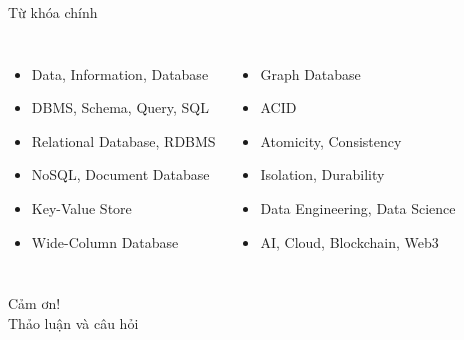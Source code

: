 ﻿\documentclass[aspectratio=169,11pt]{beamer}
\newcommand{\tightlist}{\setlength{\itemsep}{2pt}\setlength{\parskip}{0pt}}
\begin{document}
\begin{frame}{Từ khóa chính}
\small
\begin{columns}[T]
\begin{itemize}
\tightlist
  \item Data, Information, Database
  \item DBMS, Schema, Query, SQL
  \item Relational Database, RDBMS
  \item NoSQL, Document Database
  \item Key-Value Store
  \item Wide-Column Database
\end{itemize}
\begin{itemize}
\tightlist
  \item Graph Database
  \item ACID
  \item Atomicity, Consistency
  \item Isolation, Durability
  \item Data Engineering, Data Science
  \item AI, Cloud, Blockchain, Web3
\end{itemize}
\end{columns}
\end{frame}

\begin{frame}
\centering
\Huge Cảm ơn!\\[0.5cm]
\Large Thảo luận và câu hỏi
\end{frame}
\end{document}
